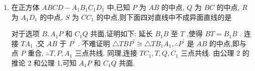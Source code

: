 \begin{enumerate}
\begin{jieda}
    \end{jieda}
    \item 在正方体 ${ABCD} - {A}_{1}{B}_{1}{C}_{1}{D}_{1}$ 中,已知 $P$ 为 ${AB}$ 的中点, $Q$ 为 ${BC}$ 的中点, $R$ 为 ${A}_{1}{D}_{1}$ 的中点, $S$ 为 $C{C}_{1}$ 的中点,则下面四对直线中不成异面直线的是
    \begin{jieda}
        对于选项 $B,{A}_{1}P$ 和 ${C}_{1}Q$ 共面,证明如下: 延长 ${B}_{1}B$ 至 $T$ ,使得 ${BT} = {B}_{1}B$ . 连接 $T{A}_{1}$ ,交 ${AB}$ 于 ${P}^{\prime }$ . 不难证明 $\bigtriangleup {TB}{P}^{\prime }\cong \bigtriangleup T{B}_{1}{A}_{1},\therefore {P}^{\prime }$ 是 ${AB}$ 的中点,即与点 $P$ 重合, $\therefore T,P,{A}_{1}$ 三点共线. 同理,连接 $T{C}_{1},T,Q,{C}_{1}$ 三点共线. 由公理 2 的推论 2 和公理 1,可知 ${A}_{1}P$ 和 ${C}_{1}Q$ 共面. 
        

\end{jieda}
\end{enumerate}
